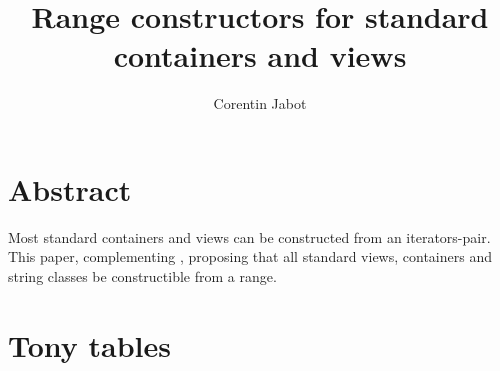 \documentclass{wg21}
\title{Range constructors for standard containers and views}
\author{Corentin Jabot}{corentin.jabot@gmail.com}
\begin{document}
\maketitle

\section{Abstract}
Most standard containers and views can be constructed from an iterators-pair.
This paper, complementing \cite{P0896R3}, proposing that all standard views,
containers and string classes be constructible from a range.

\section{Tony tables}
\end{document}
